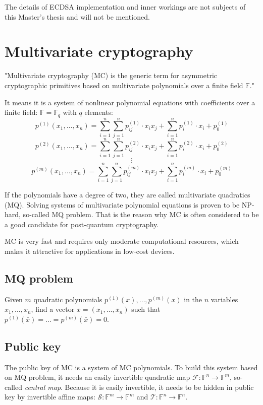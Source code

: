 \documentclass[thesis=M,english]{FITthesis}[2019/12/23]
\begin{document}
\bigskip
\noindent
The details of ECDSA implementation and inner workings are not subjects of this Master's thesis and will not be mentioned.

\newpage
\section{Multivariate cryptography}
"Multivariate cryptography (MC) is the generic term for asymmetric cryptographic primitives based on multivariate polynomials over a finite field $\mathbb{F}$."\cite{L-WIKI1}

It means it is a system of nonlinear polynomial equations with coefficients over a finite field:
 $\mathbb{F} = \mathbb{F}_q$ with $q$ elements:
\[
p^{(1)}(x_1,\ldots,x_n) = \sum\limits_{i=1}^{n} {\sum\limits_{j=1}^{n} {p_{ij}^{(1)} \cdot x_ix_j}} + \sum\limits_{i=1}^{n} {p_{i}^{(1)} \cdot x_i} + p_0^{(1)}
\]
\[
p^{(2)}(x_1,\ldots,x_n) = \sum\limits_{i=1}^{n} {\sum\limits_{j=1}^{n} {p_{ij}^{(2)} \cdot x_ix_j}} + \sum\limits_{i=1}^{n} {p_{i}^{(2)} \cdot x_i} + p_0^{(2)}
\]
\[
\vdots
\]
\[
p^{(m)}(x_1,\ldots,x_n) = \sum\limits_{i=1}^{n} {\sum\limits_{j=1}^{n} {p_{ij}^{(m)} \cdot x_ix_j}} + \sum\limits_{i=1}^{n} {p_{i}^{(m)} \cdot x_i} + p_0^{(m)}
\]

If the polynomials have a degree of two, they are called multivariate quadratics (MQ). Solving systems of multivariate polynomial equations is proven to be NP-hard, so-called MQ problem. That is the reason why MC is often considered to be a good candidate for post-quantum cryptography.

MC is very fast and requires only moderate computational resources, which makes it attractive for applications in low-cost devices.

\subsection{MQ problem}
Given $m$ quadratic polynomials $p^{(1)}(x),\ldots,p^{(m)}(x)$ in the $n$ variables $x_1,\ldots,x_n$, find a vector $\bar{x} = (\bar{x}_1,\ldots,\bar{x}_n)$ such that $p^{(1)}(\bar{x}) = \ldots = p^{(m)}(\bar{x}) = 0$.

\subsection{Public key}
The public key of MC is a system of MC polynomials. To build this system based on MQ problem, it needs an easily invertible quadratic map $\mathcal{F}: \mathbb{F}^n \rightarrow \mathbb{F}^m$, so-called \textit{central map}. Because it is easily invertible, it needs to be hidden in public key by invertible affine maps: $\mathcal{S}: \mathbb{F}^m \rightarrow \mathbb{F}^m$ and $\mathcal{T}: \mathbb{F}^n \rightarrow \mathbb{F}^n$.
\end{document}

